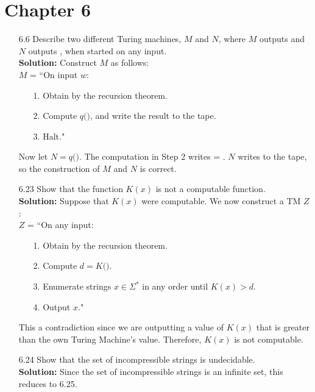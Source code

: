 \section{Chapter 6}
\begin{enumerate}
\item[6.6]Describe two different Turing machines, $M$ and $N$, where $M$ outputs  and $N$ outputs , when started on any input.
\\
\textbf{Solution:} Construct $M$ as follows:
\\
$M$ = ``On input $w$:
\begin{enumerate}
\itemsep0em
\item[1.]Obtain  by the recursion theorem.
\item[2.]Compute $q($$)$, and write the result to the tape.
\item[3.]Halt."
\end{enumerate}
Now let $N = q($$)$. The computation in Step 2 writes  = . $N$ writes  to the tape, so the construction of $M$ and $N$ is correct.

\item[6.23]Show that the function $K(x)$ is not a computable function.
\\
\textbf{Solution:} Suppose that $K(x)$ were computable. We now construct a TM $Z$:
\\
$Z$ = ``On any input:
\begin{enumerate}
\itemsep0em
\item[1.]Obtain  by the recursion theorem.
\item[2.]Compute $d = K($$)$.
\item[3.]Enumerate strings $x \in \Sigma^*$ in any order until $K(x) > d$.
\item[4.]Output $x$."
\end{enumerate}
This a contradiction since we are outputting a value of $K(x)$ that is greater than the own Turing Machine's value. Therefore, $K(x)$ is not computable.

\item[6.24]Show that the set of incompressible strings is undecidable.
\\
\textbf{Solution:} Since the set of incompressible strings is an infinite set, this reduces to 6.25.


\end{enumerate}
